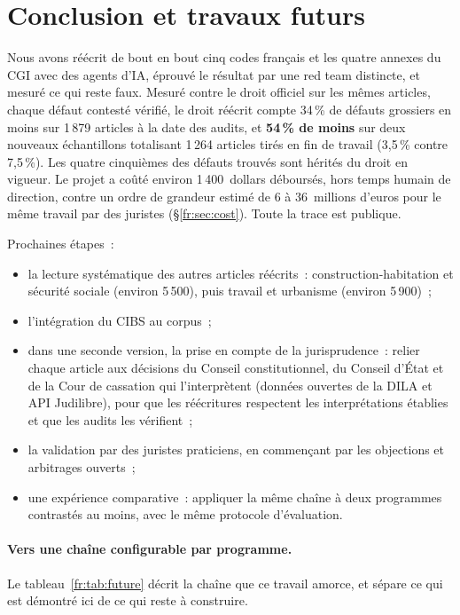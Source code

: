 \documentclass[11pt,a4paper]{article}
\begin{document}
\section{Conclusion et travaux futurs}

Nous avons réécrit de bout en bout cinq codes français et les quatre annexes du CGI avec des agents d'IA, éprouvé le résultat par une red team distincte, et mesuré ce qui reste faux. Mesuré contre le droit officiel sur les mêmes articles, chaque défaut contesté vérifié, le droit réécrit compte 34\,\% de défauts grossiers en moins sur 1\,879 articles à la date des audits, et \textbf{54\,\% de moins} sur deux nouveaux échantillons totalisant 1\,264 articles tirés en fin de travail (3,5\,\% contre 7,5\,\%). Les quatre cinquièmes des défauts trouvés sont hérités du droit en vigueur. Le projet a coûté environ 1\,400~dollars déboursés, hors temps humain de direction, contre un ordre de grandeur estimé de 6 à 36~millions d'euros pour le même travail par des juristes (\S\ref{fr:sec:cost}). Toute la trace est publique.

Prochaines étapes~:
\begin{itemize}
  \item la lecture systématique des autres articles réécrits~: construction-habitation et sécurité sociale (environ 5\,500), puis travail et urbanisme (environ 5\,900)~;
  \item l'intégration du CIBS au corpus~;
  \item dans une seconde version, la prise en compte de la jurisprudence~: relier chaque article aux décisions du Conseil constitutionnel, du Conseil d'État et de la Cour de cassation qui l'interprètent (données ouvertes de la DILA et API Judilibre), pour que les réécritures respectent les interprétations établies et que les audits les vérifient~;
  \item la validation par des juristes praticiens, en commençant par les objections et arbitrages ouverts~;
  \item une expérience comparative~: appliquer la même chaîne à deux programmes contrastés au moins, avec le même protocole d'évaluation.
\end{itemize}

\paragraph{Vers une chaîne configurable par programme.}
Le tableau~\ref{fr:tab:future} décrit la chaîne que ce travail amorce, et sépare ce qui est démontré ici de ce qui reste à construire.
\end{document}
